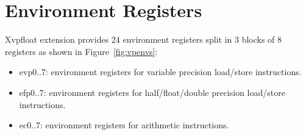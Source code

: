 \section{Environment Registers}

Xvpfloat extension provides 24 environment registers split in 3 blocks of 8 registers as shown in Figure~\ref{fig:vpenvs}:
\begin{itemize}[topsep=0pt]
    \item evp0..7: environment registers for variable precision load/store instructions.
    \item efp0..7: environment registers for half/float/double precision load/store instructions.
    \item ec0..7: environment registers for arithmetic instructions.
\end{itemize}

